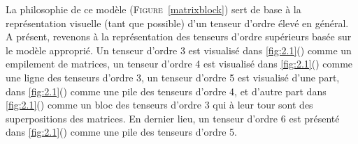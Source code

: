 \documentclass[11pt,a4paper,oneside]{book}
\newcommand{\figref}[1]{\textsc{Figure}~\ref{#1}}
\begin{document}
 La philosophie de ce modèle (\figref{matrixblock}) sert de base à la représentation visuelle (tant que possible) d'un tenseur d'ordre élevé en général. A présent, revenons à la représentation  des tenseurs d'ordre supérieurs basée sur le modèle approprié. Un tenseur d'ordre 3 est visualisé dans \ref{fig:2.1}() comme un empilement de matrices, un tenseur d'ordre 4 est visualisé dans \ref{fig:2.1}() comme une ligne des tenseurs d'ordre 3, un tenseur d'ordre 5 est visualisé d'une part, dans \ref{fig:2.1}() comme une pile des tenseurs d'ordre 4, et d'autre part dans \ref{fig:2.1}() comme un bloc des tenseurs d'ordre 3 qui à leur tour sont des superpositions des matrices. En dernier lieu, un tenseur d'ordre 6 est présenté dans \ref{fig:2.1}() comme une pile des tenseurs d'ordre 5.\\
\end{document}
